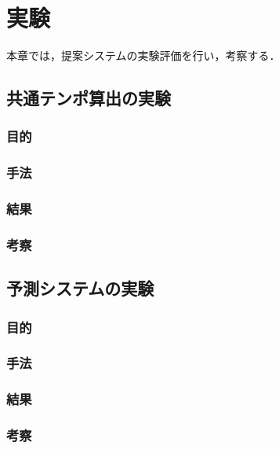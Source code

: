 \chapter{実験}
\label{evaluation}
本章では，提案システムの実験評価を行い，考察する．

\section{共通テンポ算出の実験}
\subsection{目的}
\subsection{手法}
\subsection{結果}
\subsection{考察}

\section{予測システムの実験}
\subsection{目的}
\subsection{手法}
\subsection{結果}
\subsection{考察}



